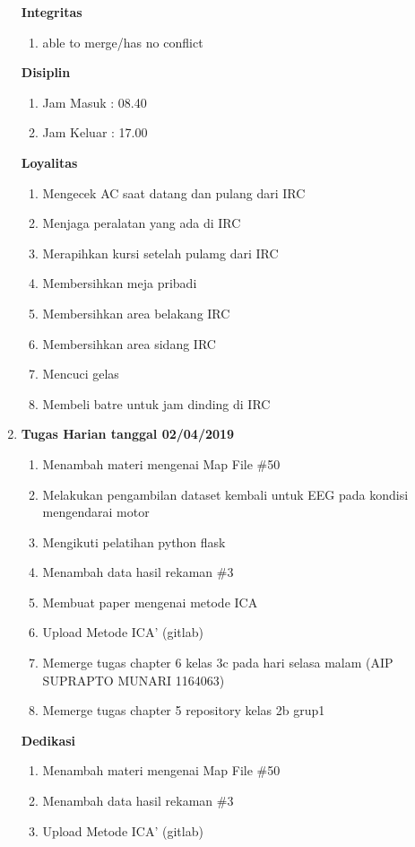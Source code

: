 \begin{enumerate}
\textbf{Integritas}
\begin{enumerate}
\item able to merge/has no conflict
\end{enumerate}

\textbf{Disiplin}
\begin{enumerate}
\item Jam Masuk : 08.40
\item Jam Keluar : 17.00
\end{enumerate}

\textbf{Loyalitas}
\begin{enumerate}
\item Mengecek AC saat datang dan pulang dari IRC
\item Menjaga peralatan yang ada di IRC
\item Merapihkan kursi setelah pulamg dari IRC
\item Membersihkan meja pribadi
\item Membersihkan area belakang IRC
\item Membersihkan area sidang IRC
\item Mencuci gelas
\item Membeli batre untuk jam dinding di IRC
\end{enumerate}


\item \textbf{Tugas Harian tanggal 02/04/2019}
\begin{enumerate}
\item Menambah materi mengenai Map File \#50
\item Melakukan pengambilan dataset kembali untuk EEG pada kondisi mengendarai motor
\item Mengikuti pelatihan python flask
\item Menambah data hasil rekaman \#3
\item Membuat paper mengenai metode ICA 
\item Upload Metode ICA' (gitlab)
\item Memerge tugas chapter 6 kelas 3c pada hari selasa malam (AIP SUPRAPTO MUNARI 1164063)
\item Memerge tugas chapter 5 repository kelas 2b grup1
\end{enumerate}

\textbf{Dedikasi}
\begin{enumerate}
\item Menambah materi mengenai Map File \#50
\item Menambah data hasil rekaman \#3
\item Upload Metode ICA' (gitlab)
\end{enumerate}


\end{enumerate}
